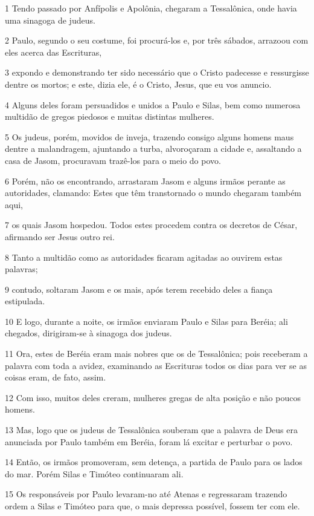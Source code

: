 \par 1 Tendo passado por Anfípolis e Apolônia, chegaram a Tessalônica, onde havia uma sinagoga de judeus.
\par 2 Paulo, segundo o seu costume, foi procurá-los e, por três sábados, arrazoou com eles acerca das Escrituras,
\par 3 expondo e demonstrando ter sido necessário que o Cristo padecesse e ressurgisse dentre os mortos; e este, dizia ele, é o Cristo, Jesus, que eu vos anuncio.
\par 4 Alguns deles foram persuadidos e unidos a Paulo e Silas, bem como numerosa multidão de gregos piedosos e muitas distintas mulheres.
\par 5 Os judeus, porém, movidos de inveja, trazendo consigo alguns homens maus dentre a malandragem, ajuntando a turba, alvoroçaram a cidade e, assaltando a casa de Jasom, procuravam trazê-los para o meio do povo.
\par 6 Porém, não os encontrando, arrastaram Jasom e alguns irmãos perante as autoridades, clamando: Estes que têm transtornado o mundo chegaram também aqui,
\par 7 os quais Jasom hospedou. Todos estes procedem contra os decretos de César, afirmando ser Jesus outro rei.
\par 8 Tanto a multidão como as autoridades ficaram agitadas ao ouvirem estas palavras;
\par 9 contudo, soltaram Jasom e os mais, após terem recebido deles a fiança estipulada.
\par 10 E logo, durante a noite, os irmãos enviaram Paulo e Silas para Beréia; ali chegados, dirigiram-se à sinagoga dos judeus.
\par 11 Ora, estes de Beréia eram mais nobres que os de Tessalônica; pois receberam a palavra com toda a avidez, examinando as Escrituras todos os dias para ver se as coisas eram, de fato, assim.
\par 12 Com isso, muitos deles creram, mulheres gregas de alta posição e não poucos homens.
\par 13 Mas, logo que os judeus de Tessalônica souberam que a palavra de Deus era anunciada por Paulo também em Beréia, foram lá excitar e perturbar o povo.
\par 14 Então, os irmãos promoveram, sem detença, a partida de Paulo para os lados do mar. Porém Silas e Timóteo continuaram ali.
\par 15 Os responsáveis por Paulo levaram-no até Atenas e regressaram trazendo ordem a Silas e Timóteo para que, o mais depressa possível, fossem ter com ele.
